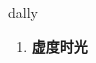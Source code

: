 
\begin{frame}
{\huge dally}
\begin{center}
\begin{enumerate}\Large
  \item \textbf{虚度时光}
\end{enumerate}
\end{center}
\end{frame}
